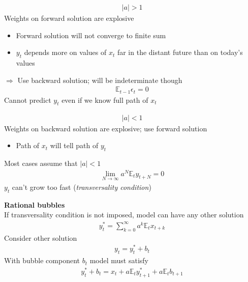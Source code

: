 \documentclass{beamer}
\begin{document}
\begin{frame}
\begin{align*}
    |a|>1
  \end{align*}
  Weights on forward solution are explosive
  \begin{itemize}
    \item Forward solution will not converge to finite sum
    \item $y_t$ depends more on values of $x_t$ far in the distant future than on today's values
  \end{itemize}  
  $\Rightarrow$ Use backward solution; will be indeterminate though
  \begin{align}
    \mathbb{E}_{t-1}\epsilon_t=0
  \end{align}
  \medskip
  Cannot predict $y_t$ even if we know full path of $x_t$
\end{frame}

\begin{frame} 
  \begin{align*}
    |a|<1
  \end{align*}
  \medskip
  Weights on backward solution are explosive; use forward solution
  \begin{itemize}
    \item Path of $x_t$ will tell path of $y_t$
  \end{itemize}
  \medskip
  Most cases assume that $|a|<1$
  \begin{align}
    \lim_{N \rightarrow \infty} a^N \mathbb{E}_t y_{t+N} = 0
  \end{align}
  \medskip
   $y_t$ can't grow too fast (\textit{transversality condition}) 
\end{frame}

\begin{frame}
  \textbf{Rational bubbles}\\
   If transversality condition is not imposed, model can have any other solution
  \begin{align}
    y_t^* = \sum^{\infty}_{k=0}a^k\mathbb{E}_tx_{t+k}
  \end{align}
   Consider other solution
  \begin{align}
    y_t = y_t^* + b_t
  \end{align}
  \medskip
  With bubble component $b_t$ model must satisfy
\begin{align}
  y_t^* + b_t = x_t + a\mathbb{E}_t y^*_{t+1} + a\mathbb{E}_tb_{t+1} 
\end{align}
\end{frame}
\end{document}
